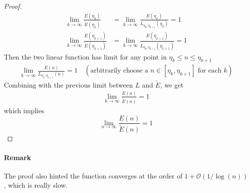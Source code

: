\documentclass[]{article}
\begin{document}
\begin{proof}
	\begin{align*}
	\lim_{k\to\infty} \frac{E(\eta_k)}{\tilde{E}(\eta_k)} &= \lim_{k\to\infty} \frac{E(\eta_k)}{L_{\eta_{k},\eta_{k+1}}(\eta_k)} = 1 \\
	\lim_{k\to\infty} \frac{E(\eta_{k+1})}{\tilde{E}(\eta_{k+1})} &= \lim_{k\to\infty} \frac{E(\eta_{k+1})}{L_{\eta_{k},\eta_{k+1}}(\eta_{k+1})} = 1
	\end{align*}
	Then the two linear function has limit for any point in $\eta_k\le n \le\eta_{k+1}$
	\begin{align*}
	\lim_{k\to\infty} \frac{E(n)}{L_{\eta_{k},\eta_{k+1}}(n)} = 1 \quad(\text{arbitrarily choose a $n\in[\eta_k,\eta_{k+1}]$ for each $k$})
	\end{align*}
	Combining with the previous limit between $L$ and $\tilde{E}$, we get
	\begin{align*}
	\lim_{k\to\infty} \frac{E(n)}{\tilde{E}(n)} = 1
	\end{align*}
	which implies 
	\[
	\lim_{n\to\infty} \frac{E(n)}{\tilde{E}(n)} = 1
	\]
	
	
\end{proof}

\paragraph{Remark}

The proof also hinted the function converges at the order of $1+\mathcal{O}(1/\log(n))$, which is really slow. 

\end{document}
